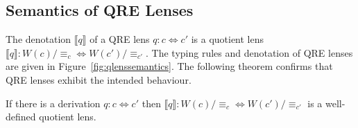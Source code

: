 \documentclass{svproc}
\newcommand{\eqrel}[1]{\ensuremath{\equiv_{#1}}}
\begin{document}
\subsection{Semantics of QRE Lenses}
The denotation $\llbracket q \rrbracket$ of a QRE lens $q:c \Leftrightarrow c'$
is a quotient lens $\llbracket q \rrbracket : W(c)/{\eqrel{c}}
\Longleftrightarrow W(c')/{\eqrel{c'}}$. The typing rules and denotation of QRE
lenses are given in Figure~\ref{fig:qlenssemantics}. The following theorem
confirms that QRE lenses exhibit the intended behaviour.

\begin{theorem}
If there is a derivation $q:c \Leftrightarrow c'$ then
$\llbracket q \rrbracket : W(c)/{\eqrel{c}} \Leftrightarrow
W(c')/{\eqrel{c'}}$ is a well-defined quotient lens.
\end{theorem}
\end{document}
